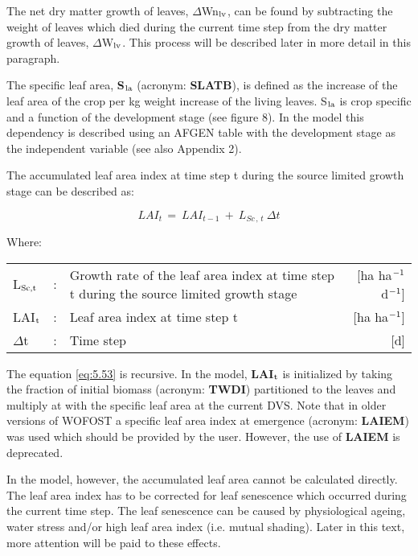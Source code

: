 The net dry matter growth of leaves, $\Delta$Wn$_{{\rm lv}}$, can be found by subtracting the weight of
leaves which died during the current time step from the dry matter growth of leaves,
$\Delta$W$_{{\rm lv}}$. This process will be described later in more detail in this paragraph.

The specific leaf area, {\bf S$_{{\rm la}}$} (acronym: {\bf SLATB}), is defined as the increase of the leaf area
of the crop per kg weight increase of the living leaves. S$_{{\rm la}}$ is crop specific and a function
of the development stage (see figure 8). In the model this dependency is described using
an AFGEN table with the development stage as the independent variable (see also
Appendix 2).

The accumulated leaf area index at time step t during the source limited growth stage can
be described as:

\begin{equation}
\label{eq:5.53}
LAI _{t~} =~LAI _{t-1} ~+~L _{Sc\, ,\, t} ~\Delta t
\end{equation}

Where:\\[5pt]
\begin{tabularx}{\textwidth}{llXr}
	L$_{{\rm Sc,t}}$ &:& Growth rate of the leaf area index at time step t
	during the source limited growth stage     &   [ha ha$^{{\rm -1}}$ d$^{{\rm -1}}$]\\
	LAI$_{{\rm t}}$ &:& Leaf area index at time step t     &
	[ha ha$^{{\rm -1}}$]\\
	$\Delta$t &:& Time step    &    [d]\\
\end{tabularx}

The equation \ref{eq:5.53} is recursive. In the model, {\bf LAI$_{{\rm t}}$} is initialized by 
taking the fraction of initial biomass (acronym: {\bf TWDI}) partitioned to the leaves and 
multiply at with the specific leaf area at the current DVS. Note that in older versions of
WOFOST a specific leaf area index at emergence (acronym: {\bf LAIEM}) was used which should 
be provided by the user. However, the use of {\bf LAIEM} is deprecated.

In the model, however, the accumulated leaf area cannot be calculated directly. The leaf
area index has to be corrected for leaf senescence which occurred during the current time
step. The leaf senescence can be caused by physiological ageing, water stress and/or high
leaf area index (i.e. mutual shading). Later in this text, more attention will be paid to
these effects.


